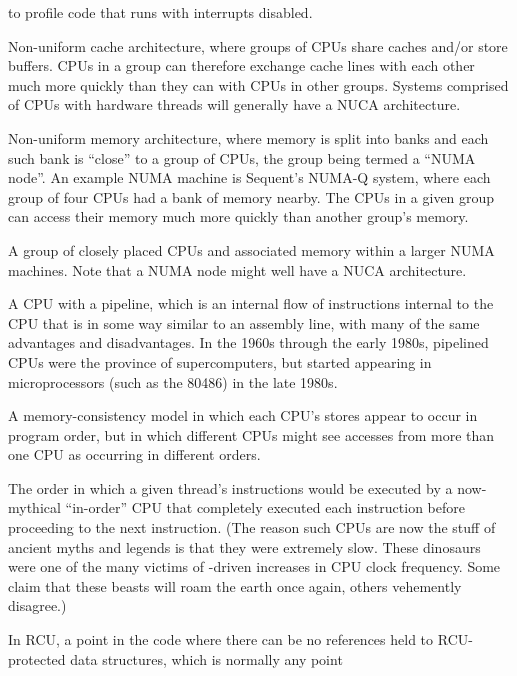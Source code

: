 \begin{description}
	to profile code that runs with interrupts disabled.
\item[NUCA:]
	Non-uniform cache architecture, where groups of CPUs share
	caches and/or store buffers.
	CPUs in a group can therefore exchange cache lines with each
	other much more quickly than they can with CPUs in other groups.
	Systems comprised of CPUs with hardware threads will generally
	have a NUCA architecture.
\item[NUMA:]
	Non-uniform memory architecture, where memory is split into
	banks and each such bank is ``close'' to a group of CPUs,
	the group being termed a ``NUMA node''.
	An example NUMA machine is Sequent's NUMA-Q system, where
	each group of four CPUs had a bank of memory nearby.
	The CPUs in a given group can access their memory much
	more quickly than another group's memory.
\item[NUMA Node:]
	A group of closely placed CPUs and associated memory within
	a larger NUMA machines.
	Note that a NUMA node might well have a NUCA architecture.
\item[Pipelined CPU:]
	A CPU with a pipeline, which is
	an internal flow of instructions internal to the CPU that
	is in some way similar to an assembly line, with many of
	the same advantages and disadvantages.
	In the 1960s through the early 1980s, pipelined CPUs were the
	province of supercomputers, but started appearing in microprocessors
	(such as the 80486) in the late 1980s.
\item[Process Consistency:]
	A memory-consistency model in which each CPU's stores appear to
	occur in program order, but in which different CPUs might see
	accesses from more than one CPU as occurring in different orders.
\item[Program Order:]
	The order in which a given thread's instructions
	would be executed by a now-mythical ``in-order'' CPU that
	completely executed each instruction before proceeding to
	the next instruction.
	(The reason such CPUs are now the stuff of ancient myths
	and legends is that they were extremely slow.
	These dinosaurs were one of the many victims of
	-driven increases in CPU clock frequency.
	Some claim that these beasts will roam the earth once again,
	others vehemently disagree.)
\item[Quiescent State:]
	In RCU, a point in the code where there can be no references held
	to RCU-protected data structures, which is normally any point

\end{description}
